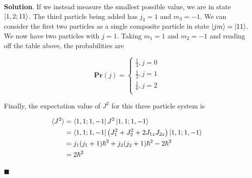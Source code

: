 \documentclass[12pt]{article}
\theoremstyle{definition}
\newenvironment{s}{%
        \begin{trivlist} \item \textbf{Solution}. }{%
            \hspace*{\fill} $\blacksquare$\end{trivlist}}%
\begin{document}
{\begin{s}
If we instead measure the smallest possible value, we are in state $\ket{1,2;11}$. The third particle being added has $j_{3} = 1$ and $m_{3} = -1$. We can consider the first two particles as a single composite particle in state $\ket{jm} = \ket{11}$. We now have two particles with $j = 1$. Taking $m_{1} = 1$ and $m_{2} = -1$ and reading off the table above, the probabilities are

$$
\mathbf{Pr}(j)=
\begin{cases}
\frac{1}{3}, j = 0 \\
\frac{1}{2}, j = 1 \\
\frac{1}{6}, j = 2 \\
\end{cases}
$$

Finally, the expectation value of $J^{2}$ for this three particle system is 

\begin{align*}
\langle J^{2} \rangle &= \bra{1,1;1,-1}J^{2}\ket{1,1;1,-1}\\
&= \bra{1,1;1,-1}\left(J_{1}^{2}+J_{2}^{2} + 2J_{1z}J_{2z}\right)\ket{1,1;1,-1}\\
&= j_{1}(j_{1}+1)\hbar^{2} + j_{2}(j_{2}+1)\hbar^{2} - 2\hbar^{2}\\
&= 2\hbar^{2}
\end{align*}

\end{s}
\end{document}
